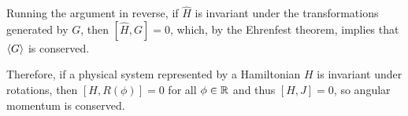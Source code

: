     
    Running the argument in reverse, if $\hat{H}$ is invariant under the transformations generated by $G$, then $[\hat{H},G]=0$, which, by the Ehrenfest theorem, implies that $\braket{G}$ is conserved.

    Therefore, if a physical system represented by a Hamiltonian $H$ is invariant under rotations, then $[H,R(\phi)] = 0$ for all $\phi\in\mathbb{R}$ and thus $[H,J]=0$, so angular momentum is conserved.

